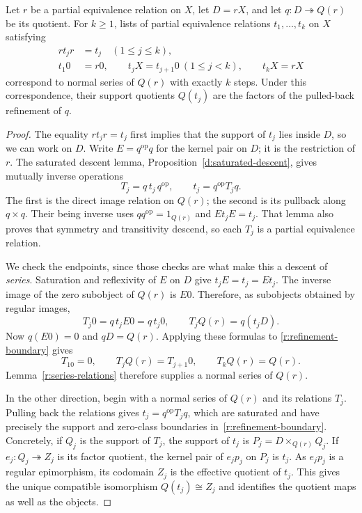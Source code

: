 \begin{proposition}
\label{r:refinement-descent}
Let $r$ be a partial equivalence relation on $X$, let $D=rX$, and let
$q:D\twoheadrightarrow Q(r)$ be its quotient.  For $k\geq1$, lists of
partial equivalence relations $t_1,\ldots,t_k$ on $X$ satisfying
\begin{align}
 rt_jr&=t_j \quad(1\leq j\leq k), \label{r:saturation}\\
 t_1 0&=r0,\qquad t_jX=t_{j+1}0\ (1\leq j<k),\qquad
 t_kX=rX \label{r:refinement-boundary}
\end{align}
correspond to normal series of $Q(r)$ with exactly $k$ steps. Under this correspondence, their
support quotients $Q(t_j)$ are the factors of the pulled-back refinement
of $q$.
\end{proposition}

\begin{proof}
The equality $rt_jr=t_j$ first implies that the support of $t_j$ lies
inside $D$, so we can work on $D$.  Write $E=q^{\mathrm{op}}q$ for the
kernel pair on $D$; it is the restriction of $r$.  The saturated descent
lemma, Proposition~\ref{d:saturated-descent}, gives mutually inverse
operations
\[
       T_j=q\,t_j\,q^{\mathrm{op}},\qquad
       t_j=q^{\mathrm{op}}T_jq.
\]
The first is the direct image relation on $Q(r)$; the second is its
pullback along $q\times q$.  Their being inverse uses $qq^{\mathrm{op}}
=1_{Q(r)}$ and $Et_jE=t_j$.  That lemma also proves that symmetry and
transitivity descend, so each $T_j$ is a partial equivalence relation.

We check the endpoints, since those checks are what make this a descent
of \emph{series}.  Saturation and reflexivity of $E$ on $D$ give
$t_jE=t_j=Et_j$.  The inverse image of the zero subobject of $Q(r)$ is
$E0$.  Therefore, as subobjects obtained by regular images,
\[
             T_j0=q\,t_jE0=q\,t_j0,
       \qquad T_jQ(r)=q(t_jD).
\]
Now $q(E0)=0$ and $qD=Q(r)$.  Applying these formulas to
\eqref{r:refinement-boundary} gives
\[
 T_10=0,\qquad T_jQ(r)=T_{j+1}0,\qquad T_kQ(r)=Q(r).
\]
Lemma~\ref{r:series-relations} therefore supplies a normal series of
$Q(r)$.

In the other direction, begin with a normal series of $Q(r)$ and its
relations $T_j$.  Pulling back the relations gives $t_j=q^{\mathrm{op}}T_jq$,
which are saturated and have precisely the support and zero-class
boundaries in~\eqref{r:refinement-boundary}.  Concretely, if $Q_j$ is the
support of $T_j$, the support of $t_j$ is $P_j=D\times_{Q(r)}Q_j$.
If $e_j:Q_j\twoheadrightarrow Z_j$ is its factor quotient, the kernel pair
of $e_jp_j$ on $P_j$ is $t_j$.  As $e_jp_j$ is a regular epimorphism,
its codomain $Z_j$ is the effective quotient of $t_j$.  This gives the
unique compatible isomorphism $Q(t_j)\cong Z_j$ and identifies the
quotient maps as well as the objects.
\end{proof}

